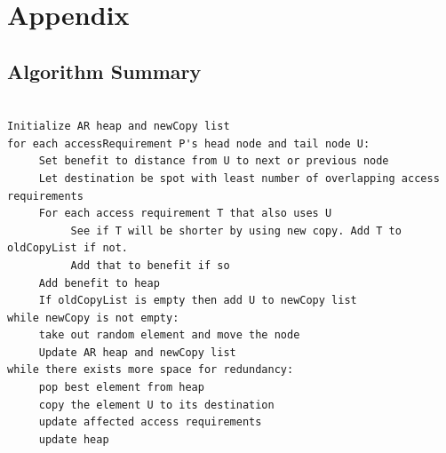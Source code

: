 \documentclass[conference]{acmsiggraph}
\begin{document}
\section{Appendix}

\subsection{Algorithm Summary}

\begin{verbatim}

Initialize AR heap and newCopy list
for each accessRequirement P's head node and tail node U:
     Set benefit to distance from U to next or previous node
     Let destination be spot with least number of overlapping access requirements
     For each access requirement T that also uses U
          See if T will be shorter by using new copy. Add T to oldCopyList if not.
          Add that to benefit if so
     Add benefit to heap
     If oldCopyList is empty then add U to newCopy list
while newCopy is not empty:
     take out random element and move the node
     Update AR heap and newCopy list
while there exists more space for redundancy:
     pop best element from heap
     copy the element U to its destination
     update affected access requirements
     update heap

\end{verbatim}
\end{document}
